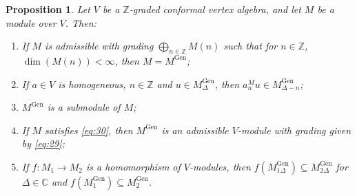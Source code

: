 \documentclass[a4paper, 12pt, reqno]{amsart}
\newtheorem{proposition}[theorem]{Proposition}
\theoremstyle{remark}
\DeclareMathOperator{\Gen}{Gen}
\begin{document}
\begin{proposition}
  \label{prp:10}
  Let $V$ be a $\mathbb{Z}$-graded conformal vertex algebra, and let $M$ be a module over $V$. Then:
  \begin{enumerate}
  \item If $M$ is admissible with grading $\bigoplus_{n \in \mathbb{Z}}M(n)$ such that for $n \in \mathbb{Z}$, $\dim(M(n)) < \infty$, then $M = M^{\Gen}$;
  \item If $a \in V$ is homogeneous, $n \in \mathbb{Z}$ and $u \in M^{\Gen}_{\Delta}$, then $a^M_nu \in M^{\Gen}_{\Delta - n}$;
  \item $M^{\Gen}$ is a submodule of $M$;
  \item If $M$ satisfies \eqref{eq:30}, then $M^{\Gen}$ is an admissible $V$-module with grading given by \eqref{eq:29};
  \item If $f: M_1 \to M_2$ is a homomorphism of $V$-modules, then $f(M^{\Gen}_{1\Delta}) \subseteq M^{\Gen}_{2\Delta}$ for $\Delta \in \mathbb{C}$ and $f(M^{\Gen}_1) \subseteq M^{\Gen}_2$.
  \end{enumerate}
\end{proposition}
\end{document}
